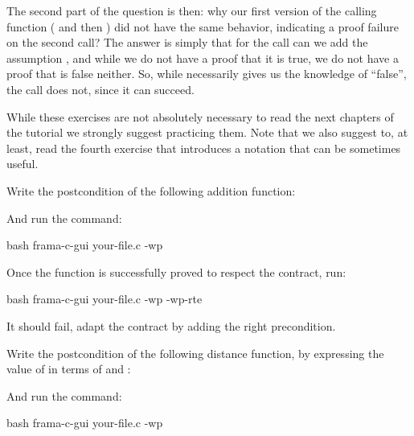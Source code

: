 The second part of the question is then: why our first version of the
calling function ( and then ) did
not have the same behavior, indicating a proof failure on the second
call? The answer is simply that for the call  can we add
the assumption , and while we do not have a proof
that it is true, we do not have a proof that is false neither. So, while
 necessarily gives us the knowledge of ``false'',
the call  does not, since it can succeed.






While these exercises are not absolutely necessary to read the next chapters
of the tutorial we strongly suggest practicing them. Note that we also
suggest to, at least, read the fourth exercise that introduces a notation
that can be sometimes useful.





Write the postcondition of the following addition function:




And run the command:


\begin{CodeBlock}{bash}
frama-c-gui your-file.c -wp
\end{CodeBlock}


Once the function is successfully proved to respect the contract, run:


\begin{CodeBlock}{bash}
frama-c-gui your-file.c -wp -wp-rte
\end{CodeBlock}


It should fail, adapt the contract by adding the right precondition.




Write the postcondition of the following distance function, by expressing
the value of  in terms of  and
:




And run the command:


\begin{CodeBlock}{bash}
frama-c-gui your-file.c -wp
\end{CodeBlock}


